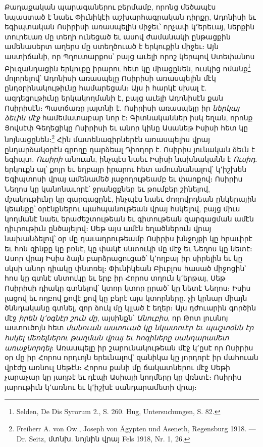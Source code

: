 \documentclass{article}
\begin{document}
{Քաղաքական պարագաներու բերմամբ, որոնց մեծապէս նպաստած է նաեւ Փիւնիկէի աշխարհագրական դիրքը, Ադոնիսի եւ եգիպտական Ոսիրիսի առասպելին միջեւ՝ որչափ կ՚երեւայ, ներքին տուրեւառ մը տեղի ունեցած եւ ասով ժամանակի ընթացքին ամենասերտ աղերս մը ստեղծուած է երկուքին միջեւ։ Այն աստիճանի, որ Պղուտարքոս՝ բայց աւելի որոշ կերպով Ստեփանոս Բիւզանդացին երկուքը իրարու հետ կը միացընեն, ուսկից ոմանք\footnote{Selden, De Dis Syrorum 2., S. 260. Hug, Untersuchungen, S. 82.} մոլորելով՝ Ադոնիսի առասպելը Ոսիրիսի առասպելին մէկ ընդօրինակութիւնը համարեցան։ Այս ի հարկէ սխալ է. ազդեցութիւնը երկակողմանի է, բայց աւելի Ադոնիսէն քան Ոսիրիսէն։ Պատճառը յայտնի է. Ոսիրիսի առասպելը իր \emph{ներկայ ձեւին մէջ} համեմատաբար նոր է։ Գիտնականներ իսկ եղան, որոնք Յովսէփ Գեղեցիկը Ոսիրիսի եւ անոր կինը Ասանեթ Իսիսի հետ կը նոյնացընեն։\footnote{Freiherr A. von Ow., Joseph von Ägypten und Aseneth, Regensburg 1918. — Dr. Seitz, մտնխ. նոյնին վրայ Fels 1918, Nr. 1, 26.} Հին մատենագիրներէն առասպելիս վրայ ընդարձակօրէն գրողը դարձեալ Դիոդոր է. Ոսիրիս յունական ձեւն է եգիպտ. \emph{Ուսիրի} անուան, ինչպէս նաեւ Իսիսի նախնականն է \emph{Ուսիդ}. երկուքն ալ՝ քոյր եւ եղբայր իրարու հետ ամուսնանալով՝ կ՚իշխեն Եգիպտոսի վրայ ամենամեծ յաջողութեամբ եւ փաոքով։ Ոսիրիս Նեղոս կը կանոնաւորէ՝ ջրանցքներ եւ թումբեր շինելով, մշակութիւնը կը զարգացընէ, ինչպէս նաեւ ժողովրդեան ընկերային կեանքը՝ օրէնքներու պահպանութեան վրայ հսկելով, բայց միւս կողմանէ նաեւ երաժեշտութեան եւ գիտութեան զարգացման ամէն դիւրութիւն ընծայելով։ Սեթ այս ամէն եղածներուն վրայ նախանձելով՝ օր մը դաւադրութեամբ Ոսիրիս խնջոյքի կը հրաւիրէ եւ հոն զինքը կը բռնէ, կը փակէ սնտուկի մը մէջ եւ Նեղոս կը նետէ։ Ասոր վրայ Իսիս ձայն բարձրացուցած՝ կ՚ողբայ իր սիրելին եւ կը սկսի անոր դիակը փնտռել։ Փիւնիկեան Բիւբլոս հասած միջոցին՝ հոս կը գտնէ սնտուկը եւ երբ իր Հորոս տղուն կ՚երթայ, Սեթ Ոսիրիսի դիակը գտնելով՝ կտոր կտոր ըրած՝ կը նետէ Նեղոս։ Իսիս լացով եւ ողբով քովէ քով կը բերէ այս կտորները. չի կրնար միայն ծննդականը գտնել, զոր ձուկ մը կլլած է եղեր։ Այս դժուարին գործին մէջ \emph{իրեն կ՚օգնէր շուն մը}, այսինքն՝ \emph{Անուբիս}, որ Թոտ լուսնոյ աստուծոյն հետ \emph{մանուան աստուած կը նկատուէր եւ պաշտօնն էր հսկել մեռելներու թաղման վրայ եւ հոգիները սանդարամետ առաջնորդել}։ Առասպելը իր շարունակութեան մէջ կ՚ըսէ որ Ոսիրիս օր մը իր Հորոս որդւոյն երեւնալով՝ զանիկա կը յորդորէ իր մահուան վրէժը առնուլ Սեթէն։ Հորոս քանի մը ճակատներու մէջ Սեթի չարաչար կը յաղթէ եւ դէպի Ասիայի կողմերը կը վռնտէ։ Ոսիրիս յարութիւն կ՚առնու եւ կ՚իշխէ սանդարամետի վրայ։

}
\end{document}
